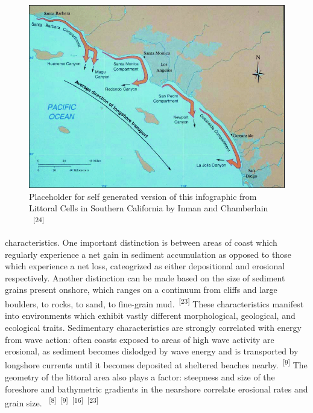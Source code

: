 \documentclass{article}
\begin{document}
\newpage
{}
\fancyfoot[C]{\thepage} 
\thispagestyle{fancy}

\begin{figure}
    \centering
    \includegraphics[width=.9\linewidth]{images/so-cal-littoral-cells.png}
    \caption{Placeholder for self generated version of this infographic from Littoral Cells in Southern California by Inman and Chamberlain ~\textsuperscript{[24]}}
    \label{figure6}
\end{figure}

\par{\noindent characteristics. One important distinction is between areas of coast which regularly experience a net gain in sediment accumulation as opposed to those which experience a net loss, cateogrized as either depositional and erosional respectively. Another distinction can be made based on the size of sediment grains present onshore, which ranges on a continuum from cliffs and large boulders, to rocks, to sand, to fine-grain mud.~\textsuperscript{[23]} These characteristics manifest into environments which exhibit vastly different morphological, geological, and ecological traits. Sedimentary characteristics are strongly correlated with energy from wave action: often coasts exposed to areas of high wave activity are erosional, as sediment becomes dislodged by wave energy and is transported by longshore currents until it becomes deposited at sheltered beaches nearby.~\textsuperscript{[9]} The geometry of the littoral area also plays a factor: steepness and size of the foreshore and bathymetric gradients in the nearshore correlate erosional rates and grain size. ~\textsuperscript{[8]}~\textsuperscript{[9]}~\textsuperscript{[16]}~\textsuperscript{[23]}}
\end{document}

